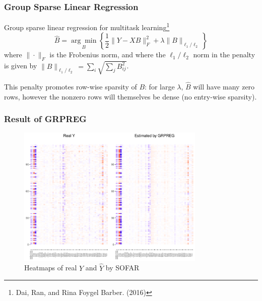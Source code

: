 \begin{frame}\frametitle{Group Sparse Linear Regression}
    Group sparse linear regression for multitask learning\footnote[1]{Dai, Ran, and Rina Foygel Barber. (2016)}
    \begin{equation}
        \widehat{B}=\underset{B}{\arg \min }\left\{\frac{1}{2}\|Y-X B\|_{F}^{2}+\lambda\|B\|_{\ell_{1} / \ell_{2}}\right\}
    \end{equation}
    where $\|\cdot\|_{F}$ is the Frobenius norm,%
    and where the $\ell_1/\ell_2$ norm in the penalty is given by
    $\|B\|_{\ell_1/\ell_2} = \sum_i \sqrt{\sum_j B_{ij}^2}$.

    This penalty promotes row-wise sparsity of $B$: for large $\lambda$, $\widehat{B}$ will have many zero rows, however the nonzero rows will
    themselves be dense (no entry-wise sparsity).
\end{frame}

\begin{frame}
    \frametitle{Result of GRPREG}
    \begin{figure}[h]
        \centering
        \includegraphics[width=0.8\textwidth]{./figs/heatmap_grpreg.pdf}
        \caption{Heatmaps of real $Y$ and $\hat{Y}$ by SOFAR}
    \end{figure}
\end{frame}

